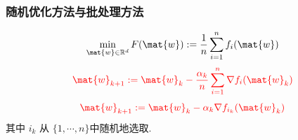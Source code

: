 \documentclass[handout]{beamer}
\begin{document}
\begin{frame}
\frametitle{随机优化方法与批处理方法}

$$\min\limits_{\mat{w}\in{\mathbb{R}^d}} F(\mat{w}):=\frac{1}{n}\sum\limits_{i=1}^{n}f_i(\mat{w})$$
{\color{blue}{最速下降法}}
 $${\color{red} \mat{w}_{k+1} := \mat{w}_k - \frac{\alpha_k}{n}\sum_{i=1}^n\nabla f_i(\mat{w}_k)}$$
{\color{blue}{随机梯度法}}
 $${\color{red} \mat{w}_{k+1} := \mat{w}_k - {\alpha_k} \nabla f_{i_k}(\mat{w}_{k})}$$
 其中 $i_k$ 从 $\{1,\cdots, n\}$中随机地选取.

\end{frame}

\end{document}

